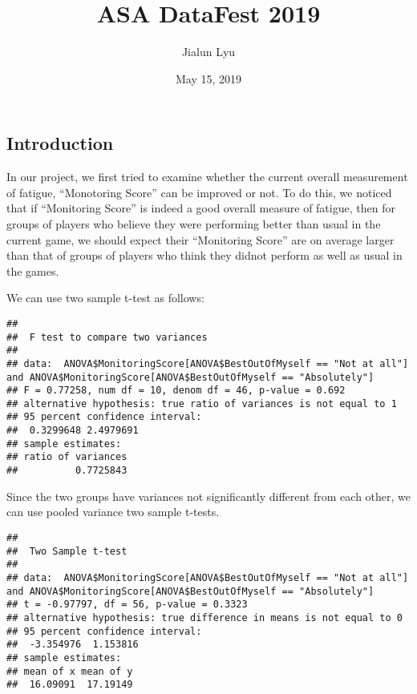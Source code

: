 \documentclass[]{article}
\title{ASA DataFest 2019}
\author{Jialun Lyu}
\date{May 15, 2019}
\newenvironment{Shaded}{\begin{snugshade}}{\end{snugshade}}
\newcommand{\DataTypeTok}[1]{\textcolor[rgb]{0.13,0.29,0.53}{#1}}
\newcommand{\KeywordTok}[1]{\textcolor[rgb]{0.13,0.29,0.53}{\textbf{#1}}}
\newcommand{\NormalTok}[1]{#1}
\newcommand{\OperatorTok}[1]{\textcolor[rgb]{0.81,0.36,0.00}{\textbf{#1}}}
\newcommand{\StringTok}[1]{\textcolor[rgb]{0.31,0.60,0.02}{#1}}
\begin{document}
\maketitle

\hypertarget{introduction}{%
\subsection{Introduction}\label{introduction}}

In our project, we first tried to examine whether the current overall
measurement of fatigue, ``Monotoring Score'' can be improved or not. To
do this, we noticed that if ``Monitoring Score'' is indeed a good
overall measure of fatigue, then for groups of players who believe they
were performing better than usual in the current game, we should expect
their ``Monitoring Score'' are on average larger than that of groups of
players who think they didnot perform as well as usual in the games.

We can use two sample t-test as follows:

\begin{verbatim}
## 
##  F test to compare two variances
## 
## data:  ANOVA$MonitoringScore[ANOVA$BestOutOfMyself == "Not at all"] and ANOVA$MonitoringScore[ANOVA$BestOutOfMyself == "Absolutely"]
## F = 0.77258, num df = 10, denom df = 46, p-value = 0.692
## alternative hypothesis: true ratio of variances is not equal to 1
## 95 percent confidence interval:
##  0.3299648 2.4979691
## sample estimates:
## ratio of variances 
##          0.7725843
\end{verbatim}

Since the two groups have variances not significantly different from
each other, we can use pooled variance two sample t-tests.

\begin{Shaded}
\end{Shaded}

\begin{verbatim}
## 
##  Two Sample t-test
## 
## data:  ANOVA$MonitoringScore[ANOVA$BestOutOfMyself == "Not at all"] and ANOVA$MonitoringScore[ANOVA$BestOutOfMyself == "Absolutely"]
## t = -0.97797, df = 56, p-value = 0.3323
## alternative hypothesis: true difference in means is not equal to 0
## 95 percent confidence interval:
##  -3.354976  1.153816
## sample estimates:
## mean of x mean of y 
##  16.09091  17.19149
\end{verbatim}
\end{document}
